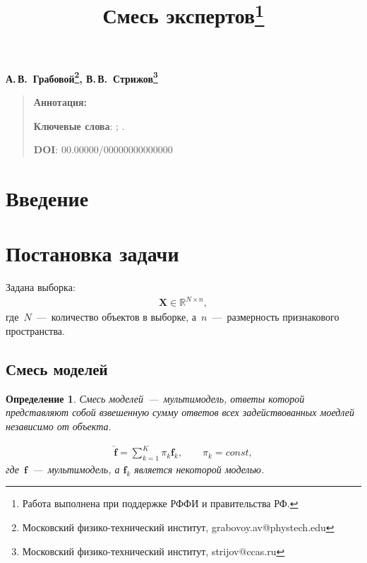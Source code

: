 \documentclass[12pt, twoside]{article}
\newtheorem{definition}{Определение}[section]
\numberwithin{equation}{section}
\begin{document}
\title{\bf Смесь экспертов\thanks{Работа выполнена при поддержке РФФИ и правительства РФ.}}
\date{}
\author{}
\maketitle

\begin{center}
\bf
А.\,В.~Грабовой\footnote{Московский физико-технический институт, grabovoy.av@phystech.edu}, В.\,В.~Стрижов\footnote{Московский физико-технический институт, strijov@ccas.ru}

\end{center}

{\centering\begin{quote}
\textbf{Аннотация:} 


\smallskip
\textbf{Ключевые слова}: ; .

\smallskip
\textbf{DOI}: 00.00000/00000000000000
\end{quote}
}

\section{Введение}

\section{Постановка задачи}

Задана выборка:
\begin{equation}
\label{eq:st:1}
\begin{aligned}
\textbf{X} \in \mathbb{R}^{N \times n},
\end{aligned}
\end{equation}
где~$N$~---~количество объектов в выборке, а~$n$~---~размерность признакового пространства.

\subsection{Смесь моделей}

\begin{definition}
Смесь моделей~---~мультимодель, ответы которой представляют собой взвешенную сумму ответов всех задействованных моедлей независимо от объекта.

\begin{equation}
\label{eq:st:2}
\begin{aligned}
\hat{\textbf{f}} = \sum_{k=1}^{K}\pi_{k}\textbf{f}_k, \qquad \pi_{k} = const,
\end{aligned}
\end{equation}
где~$\textbf{f}$~---~мультимодель, а $\textbf{f}_k$ является некоторой моделью.
\end{definition}
\end{document}
